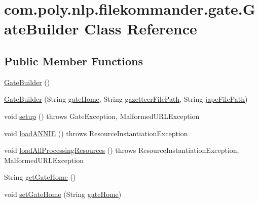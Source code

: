 \hypertarget{classcom_1_1poly_1_1nlp_1_1filekommander_1_1gate_1_1_gate_builder}{\section{com.\-poly.\-nlp.\-filekommander.\-gate.\-Gate\-Builder Class Reference}
\label{classcom_1_1poly_1_1nlp_1_1filekommander_1_1gate_1_1_gate_builder}
}
\subsection*{Public Member Functions}
\begin{DoxyCompactItemize}
\item 
\hyperlink{classcom_1_1poly_1_1nlp_1_1filekommander_1_1gate_1_1_gate_builder_a288d8f16ba055b3e796a70ed0ed8880f}{Gate\-Builder} ()
\item 
\hyperlink{classcom_1_1poly_1_1nlp_1_1filekommander_1_1gate_1_1_gate_builder_a7207b79e575a053f54b2bfdad78fa484}{Gate\-Builder} (String \hyperlink{classcom_1_1poly_1_1nlp_1_1filekommander_1_1gate_1_1_gate_builder_abdefcfc6edae8b7edf26f0381ed9da34}{gate\-Home}, String \hyperlink{classcom_1_1poly_1_1nlp_1_1filekommander_1_1gate_1_1_gate_builder_adceaef80d20a83bd8c1cded83b90a692}{gazetteer\-File\-Path}, String \hyperlink{classcom_1_1poly_1_1nlp_1_1filekommander_1_1gate_1_1_gate_builder_a58783e8638545aa5ea65a89aa1061dde}{jape\-File\-Path})
\item 
void \hyperlink{classcom_1_1poly_1_1nlp_1_1filekommander_1_1gate_1_1_gate_builder_a8e881458a0b92c051232cff244561631}{setup} ()  throws Gate\-Exception, Malformed\-U\-R\-L\-Exception 
\item 
void \hyperlink{classcom_1_1poly_1_1nlp_1_1filekommander_1_1gate_1_1_gate_builder_af19109687b716d1cbcad8db3dc35873f}{load\-A\-N\-N\-I\-E} ()  throws Resource\-Instantiation\-Exception 
\item 
void \hyperlink{classcom_1_1poly_1_1nlp_1_1filekommander_1_1gate_1_1_gate_builder_a7cec7e92b34ae41c3d8257b315bf6884}{load\-All\-Processing\-Resources} ()  throws Resource\-Instantiation\-Exception, Malformed\-U\-R\-L\-Exception 
\item 
String \hyperlink{classcom_1_1poly_1_1nlp_1_1filekommander_1_1gate_1_1_gate_builder_a455d08082f02c0d550c0a3b0e344a434}{get\-Gate\-Home} ()
\item 
void \hyperlink{classcom_1_1poly_1_1nlp_1_1filekommander_1_1gate_1_1_gate_builder_a23ea43a49ea434ef84d3c793057dc899}{set\-Gate\-Home} (String \hyperlink{classcom_1_1poly_1_1nlp_1_1filekommander_1_1gate_1_1_gate_builder_abdefcfc6edae8b7edf26f0381ed9da34}{gate\-Home})

\end{DoxyCompactItemize}

